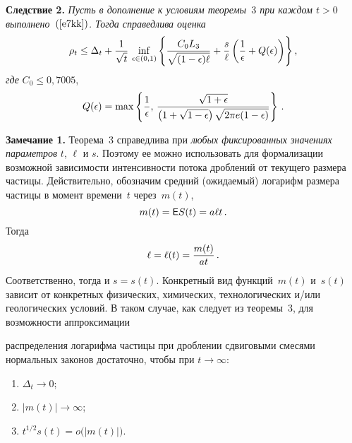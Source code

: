 \begin{multicols}{2}
\smallskip

\noindent
\textbf{Следствие 2.} {\it Пусть в дополнение к условиям тео\-ре\-мы~$3$
при каждом $t>0$ выполнено~$(\ref{e7kk})$. Тогда справедлива оценка
$$
\rho_t \leq \Delta_t
+\displaystyle\frac{\displaystyle 1\mathstrut}{\displaystyle \sqrt{t}\mathstrut}\,\inf_{\epsilon\in(0,1)}\left\{\displaystyle\frac{\displaystyle C_0L_3\mathstrut}{\displaystyle \sqrt{(1-\epsilon)\ell}\mathstrut}+
\displaystyle\frac{\displaystyle s\mathstrut}{\displaystyle \ell\mathstrut}\left(\displaystyle\frac{\displaystyle 1\mathstrut}{\displaystyle \epsilon\mathstrut}+Q(\epsilon)\right)\right\},
$$
где} $C_0\le 0{,}7005$,
$$
Q(\epsilon)=\max\left\{\displaystyle\frac{\displaystyle 1\mathstrut}{\displaystyle \epsilon\mathstrut},\,\displaystyle\frac{\displaystyle \sqrt{1+\epsilon}\mathstrut}{\displaystyle \left(1+\sqrt{1-\epsilon}\right)\sqrt{2\pi
e(1-\epsilon)}\mathstrut}\right\}\,.
$$

\medskip

\noindent
\textbf{Замечание 1.} Теорема~3 справедлива при {\it любых
фиксированных значениях параметров} $t$, $\ell$ и $s$. Поэтому ее
можно использовать для формализации возможной зависимости
интенсивности потока дроблений от текущего размера частицы.
Действительно, обозначим средний (ожидаемый) логарифм размера
частицы в момент времени~$t$ через~$m(t)$,
$$
m(t)={\sf E}S(t)=a\ell t\,.
$$
Тогда
$$
\ell=\ell(t)=\displaystyle\frac{\displaystyle m(t)\mathstrut}{\displaystyle at\mathstrut}\,.
$$
Соответственно, тогда и $s=s(t)$. Конкретный вид функций~$m(t)$ и~$s(t)$
зависит от конкретных физических, химических,
технологических и/или геологических условий. В таком случае, как
следует из теоремы~3, для возможности аппроксимации\linebreak\vspace*{-12pt}
\pagebreak


\noindent
 распределения
логарифма частицы при дроблении
 сдвиговыми смесями нормальных
законов достаточно, чтобы при $t\to\infty$:\\[-5pt]
\begin{enumerate}[1)]
\item $\Delta_t\longrightarrow 0$;\\[-6pt]
\item $|m(t)|\longrightarrow \infty$;\\[-6pt]
\item $t^{1/2}s(t)=o\big(|m(t)|\big)$.
\end{enumerate}

\medskip


\end{multicols}
